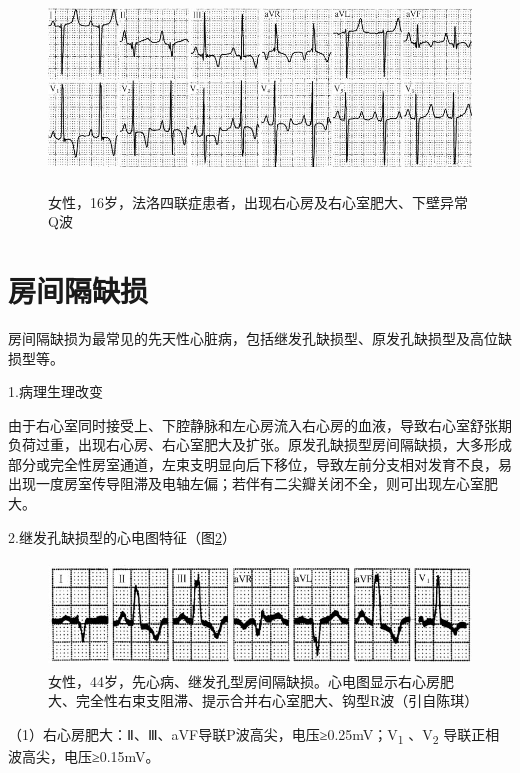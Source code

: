 \begin{figure}[!htbp]
 \centering
 \includegraphics[width=5.5625in,height=2.09375in]{./images/Image00683.jpg}
 \captionsetup{justification=centering}
 \caption{女性，16岁，法洛四联症患者，出现右心房及右心室肥大、下壁异常Q波}
 \label{fig41-1}
  \end{figure} 

\protect\hypertarget{text00049.htmlux5cux23subid581}{}{}

\section{房间隔缺损}

房间隔缺损为最常见的先天性心脏病，包括继发孔缺损型、原发孔缺损型及高位缺损型等。

1.病理生理改变

由于右心室同时接受上、下腔静脉和左心房流入右心房的血液，导致右心室舒张期负荷过重，出现右心房、右心室肥大及扩张。原发孔缺损型房间隔缺损，大多形成部分或完全性房室通道，左束支明显向后下移位，导致左前分支相对发育不良，易出现一度房室传导阻滞及电轴左偏；若伴有二尖瓣关闭不全，则可出现左心室肥大。

2.继发孔缺损型的心电图特征（图\ref{fig41-2}）

\begin{figure}[!htbp]
 \centering
 \includegraphics[width=4.79167in,height=1.10417in]{./images/Image00684.jpg}
 \captionsetup{justification=centering}
 \caption{女性，44岁，先心病、继发孔型房间隔缺损。心电图显示右心房肥大、完全性右束支阻滞、提示合并右心室肥大、钩型R波（引自陈琪）}
 \label{fig41-2}
  \end{figure} 

（1）右心房肥大：Ⅱ、Ⅲ、aVF导联P波高尖，电压≥0.25mV；V\textsubscript{1}
、V\textsubscript{2} 导联正相波高尖，电压≥0.15mV。

